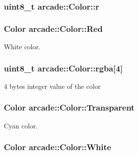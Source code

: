 \hypertarget{unionarcade_1_1_color_a20637c0cb142a384bd034cceacafe6e0}{
\subsubsection[{r}]{\setlength{\rightskip}{0pt plus 5cm}uint8\-\_\-t arcade\-::\-Color\-::r}}\label{unionarcade_1_1_color_a20637c0cb142a384bd034cceacafe6e0}
\hypertarget{unionarcade_1_1_color_a7101e34126fdb3c14d53045681938293}{
\subsubsection[{Red}]{ {\bf Color} arcade\-::\-Color\-::\-Red\hspace{0.3cm}{\ttfamily [static]}}}\label{unionarcade_1_1_color_a7101e34126fdb3c14d53045681938293}


White color. 

\hypertarget{unionarcade_1_1_color_a805bb231543d607ee00f353506c850be}{
\subsubsection[{rgba}]{\setlength{\rightskip}{0pt plus 5cm}uint8\-\_\-t arcade\-::\-Color\-::rgba\mbox{[}4\mbox{]}}}\label{unionarcade_1_1_color_a805bb231543d607ee00f353506c850be}


4 bytes integer value of the color 

\hypertarget{unionarcade_1_1_color_a689350442a28301beb49ca78a4885e4f}{
\subsubsection[{Transparent}]{ {\bf Color} arcade\-::\-Color\-::\-Transparent\hspace{0.3cm}{\ttfamily [static]}}}\label{unionarcade_1_1_color_a689350442a28301beb49ca78a4885e4f}


Cyan color. 

\hypertarget{unionarcade_1_1_color_aa8bd809fbf902dbbe53b9bb6802eb57f}{
\subsubsection[{White}]{ {\bf Color} arcade\-::\-Color\-::\-White\hspace{0.3cm}{\ttfamily [static]}}}\label{unionarcade_1_1_color_aa8bd809fbf902dbbe53b9bb6802eb57f}


